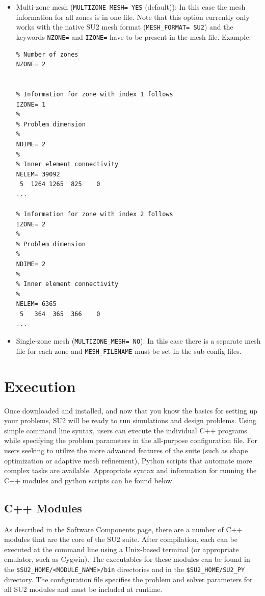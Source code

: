 \documentclass{article}
\begin{document}
\begin{itemize}
    \item Multi-zone mesh (\verb|MULTIZONE_MESH= YES| (default)): In this case the mesh information for all zones is in one file. Note that this option currently only works with the native SU2 mesh format (\verb|MESH_FORMAT= SU2|) and the keywords \verb|NZONE=| and \verb|IZONE=| have to be present in the mesh file. Example:
    \begin{lstlisting}
% Number of zones
NZONE= 2


% Information for zone with index 1 follows
IZONE= 1
%
% Problem dimension
%
NDIME= 2
%
% Inner element connectivity
NELEM= 39092
 5  1264 1265  825    0
...

% Information for zone with index 2 follows
IZONE= 2
%
% Problem dimension
%
NDIME= 2
%
% Inner element connectivity
%
NELEM= 6365
 5   364  365  366    0
...
\end{lstlisting}
    \item  Single-zone mesh (\verb|MULTIZONE_MESH= NO|): In this case there is a separate mesh file for each zone and \verb|MESH_FILENAME| must be set in the sub-config files.
\end{itemize}

   


\newpage
\section{Execution}
Once downloaded and installed, and now that you know the basics for setting up your problems, SU2 will be ready to run simulations and design problems. Using simple command line syntax, users can execute the individual C++ programs while specifying the problem parameters in the all-purpose configuration file. For users seeking to utilize the more advanced features of the suite (such as shape optimization or adaptive mesh refinement), Python scripts that automate more complex tasks are available. Appropriate syntax and information for running the C++ modules and python scripts can be found below.

\subsection{C++ Modules}
As described in the Software Components page, there are a number of C++ modules that are the core of the SU2 suite. After compilation, each can be executed at the command line using a Unix-based terminal (or appropriate emulator, such as Cygwin). The executables for these modules can be found in the \verb|$SU2_HOME/<MODULE_NAME>/bin| directories and in the \verb|$SU2_HOME/SU2_PY| directory. The configuration file specifies the problem and solver parameters for all SU2 modules and must be included at runtime.
\end{document}
